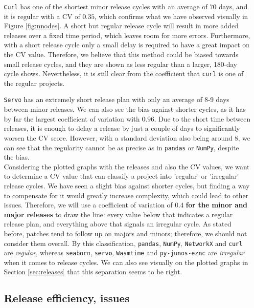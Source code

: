 \texttt{Curl} has one of the shortest minor release cycles with an average of 70 days, and it is regular with a CV of $0.35$, which confirms what we have observed visually in Figure \ref{fig:nnodes}. A short but regular release cycle will result in more added releases over a fixed time period, which leaves room for more errors. Furthermore, with a short release cycle only a small delay is required to have a great impact on the CV value. Therefore, we believe that this method could be biased towards small release cycles, and they are shown as less regular than a larger, 180-day cycle shows. Nevertheless, it is still clear from the coefficient that \texttt{curl} is one of the regular projects.

\texttt{Servo} has an extremely short release plan with only an average of 8-9 days between minor releases. We can also see the bias against shorter cycles, as it has by far the largest coefficient of variation with $0.96$. Due to the short time between releases, it is enough to delay a release by just a couple of days to significantly worsen the CV score. However, with a standard deviation also being around 8, we can see that the regularity cannot be as precise as in \texttt{pandas} or \texttt{NumPy}, despite the bias. \\

Considering the plotted graphs with the releases and also the CV values, we want to determine a CV value that can classify a project into 'regular' or 'irregular' release cycles. We have seen a slight bias against shorter cycles, but finding a way to compensate for it would greatly increase complexity, which could lead to other issues. Therefore, we will use a coefficient of variation of $0.4$ \textbf{for the minor and major releases} to draw the line: every value below that indicates a regular release plan, and everything above that signals an irregular cycle. As stated before, patches tend to follow up on majors and minors; therefore, we should not consider them overall.  By this classification, \texttt{pandas}, \texttt{NumPy}, \texttt{NetworkX} and \texttt{curl} are \textit{regular}, whereas \texttt{seaborn}, \texttt{servo}, \texttt{Wasmtime} and \texttt{py-junos-eznc} are \textit{irregular} when it comes to release cycles. We can also see visually on the plotted graphs in Section \ref{sec:releases} that this separation seems to be right.

\subsection{Release efficiency, issues}

